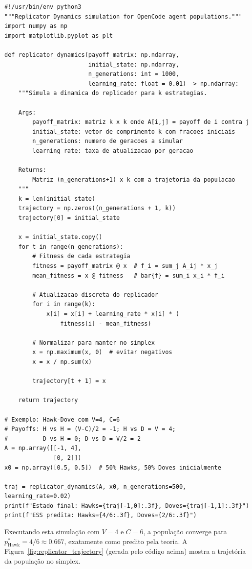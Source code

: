 \begin{verbatim}
#!/usr/bin/env python3
"""Replicator Dynamics simulation for OpenCode agent populations."""
import numpy as np
import matplotlib.pyplot as plt

def replicator_dynamics(payoff_matrix: np.ndarray,
                        initial_state: np.ndarray,
                        n_generations: int = 1000,
                        learning_rate: float = 0.01) -> np.ndarray:
    """Simula a dinamica do replicador para k estrategias.

    Args:
        payoff_matrix: matriz k x k onde A[i,j] = payoff de i contra j
        initial_state: vetor de comprimento k com fracoes iniciais
        n_generations: numero de geracoes a simular
        learning_rate: taxa de atualizacao por geracao

    Returns:
        Matriz (n_generations+1) x k com a trajetoria da populacao
    """
    k = len(initial_state)
    trajectory = np.zeros((n_generations + 1, k))
    trajectory[0] = initial_state

    x = initial_state.copy()
    for t in range(n_generations):
        # Fitness de cada estrategia
        fitness = payoff_matrix @ x  # f_i = sum_j A_ij * x_j
        mean_fitness = x @ fitness   # bar{f} = sum_i x_i * f_i

        # Atualizacao discreta do replicador
        for i in range(k):
            x[i] = x[i] + learning_rate * x[i] * (
                fitness[i] - mean_fitness)

        # Normalizar para manter no simplex
        x = np.maximum(x, 0)  # evitar negativos
        x = x / np.sum(x)

        trajectory[t + 1] = x

    return trajectory

# Exemplo: Hawk-Dove com V=4, C=6
# Payoffs: H vs H = (V-C)/2 = -1; H vs D = V = 4;
#          D vs H = 0; D vs D = V/2 = 2
A = np.array([[-1, 4],
              [0, 2]])
x0 = np.array([0.5, 0.5])  # 50% Hawks, 50% Doves inicialmente

traj = replicator_dynamics(A, x0, n_generations=500, learning_rate=0.02)
print(f"Estado final: Hawks={traj[-1,0]:.3f}, Doves={traj[-1,1]:.3f}")
print(f"ESS predita: Hawks={4/6:.3f}, Doves={2/6:.3f}")
\end{verbatim}

Executando esta simulação com $V=4$ e $C=6$, a população converge para $p^*_{\text{Hawk}} = 4/6 \approx 0.667$, exatamente como predito pela teoria. A Figura~\ref{fig:replicator_trajectory} (gerada pelo código acima) mostra a trajetória da população no simplex.


